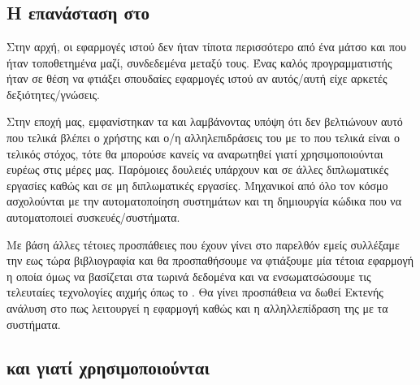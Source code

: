 \chapter{}

\section{Η επανάσταση στο }
Στην αρχή, οι εφαρμογές ιστού δεν ήταν τίποτα περισσότερο από ένα μάτσο  και
 που ήταν τοποθετημένα μαζί, συνδεδεμένα μεταξύ τους. Ένας καλός προγραμματιστής ήταν σε θέση να φτιάξει σπουδαίες εφαρμογές ιστού αν αυτός/αυτή
είχε αρκετές δεξιότητες/γνώσεις.

Στην εποχή μας, εμφανίστηκαν τα  και λαμβάνοντας υπόψη ότι δεν βελτιώνουν αυτό που τελικά βλέπει ο χρήστης και ο/η
αλληλεπιδράσεις του με το  που τελικά είναι ο τελικός στόχος, τότε
θα μπορούσε κανείς να αναρωτηθεί γιατί χρησιμοποιούνται ευρέως στις μέρες μας.
Παρόμοιες δουλειές υπάρχουν και σε άλλες διπλωματικές εργασίες καθώς και σε μη διπλωματικές εργασίες. Μηχανικοί από όλο τον κόσμο
ασχολούνται με την αυτοματοποίηση συστημάτων και τη δημιουργία κώδικα που να αυτοματοποιεί συσκευές/συστήματα. 

Με βάση άλλες τέτοιες προσπάθειες που έχουν γίνει στο παρελθόν εμείς συλλέξαμε την εως τώρα βιβλιογραφία
και θα προσπαθήσουμε να φτιάξουμε μία τέτοια εφαρμογή η οποία όμως να βασίζεται στα τωρινά δεδομένα και να 
ενσωματσώσουμε τις τελευταίες τεχνολογίες αιχμής όπως το . Θα γίνει προσπάθεια να δωθεί Εκτενής
ανάλυση στο πως λειτουργεί η εφαρμογή καθώς και η αλληλλεπίδραση της με τα συστήματα.

\section{ και γιατί χρησιμοποιούνται}

